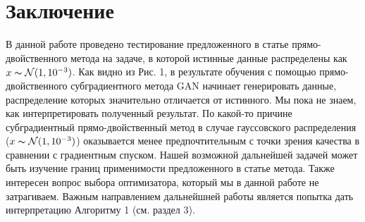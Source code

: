 \documentclass[preprint,12pt]{elsarticle}
\begin{document}
\section{Заключение}
В данной работе проведено тестирование предложенного в статье  \cite{chen2018training} прямо-двойственного метода на задаче, в которой истинные данные распределены как $ x  \thicksim \mathcal{N} (1, 10^{-3}) $. 
Как видно из Рис. 1, в результате обучения с помощью прямо-двойственного субградиентного метода GAN начинает генерировать данные, распределение которых значительно отличается от истинного. Мы пока не знаем, как интерпретировать полученный результат. 
По какой-то причине субградиентный прямо-двойственный метод в случае гауссовского распределения ($x \thicksim \mathcal{N} (1, 10^{-3}) $) оказывается менее предпочтительным с точки зрения качества в сравнении с градиентным спуском. 
Нашей возможной дальнейшей задачей может быть изучение границ применимости предложенного в статье \cite{chen2018training} метода. 
Также интересен вопрос выбора оптимизатора, который мы в данной работе не затрагиваем. Важным направлением дальнейшней работы является попытка дать интерпретацию Алгоритму 1 (см. раздел 3).
\label{S:5}
 



\cite{chen2018training}
\cite{lu2018understand}
\cite{goodfellow2014generative}
\end{document}
